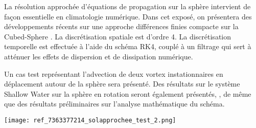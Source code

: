 \documentclass[10pt]{article}
\begin{document}
La r\'esolution approch\'ee d'\'equations de propagation sur la sph\`ere 
intervient de fa\c con essentielle en climatologie num\'erique.
Dans cet expos\'e, on pr\'esentera des d\'eveloppements r\'ecents 
sur une approche diff\'erences finies compacte \cite{Lele1991} sur la Cubed-Sphere \cite{Ronchi1996}.
La discr\'etisation spatiale est d'ordre 4. 
La discr\'etisation temporelle est effectu\'ee \`a l'aide du sch\'ema RK4,
coupl\'e \`a un filtrage qui sert \`a att\'enuer les effets 
de dispersion et de dissipation num\'erique.

Un cas test repr\'esentant l'advection de 
deux vortex instationnaires en d\'eplacement autour de la sph\`ere \cite{Nair2008} sera pr\'esent\'e.
Des r\'esultats sur le syst\`eme Shallow Water sur la sph\`ere en rotation 
seront \'egalement pr\'esent\'es, \cite{Brachet2016}, de m\^eme que des r\'esultats 
pr\'eliminaires sur l'analyse math\'ematique
du sch\'ema.

\begin{center}
\texttt{[image: ref\_7363377214\_solapprochee\_test\_2.png]}
\end{center}
\end{document}
